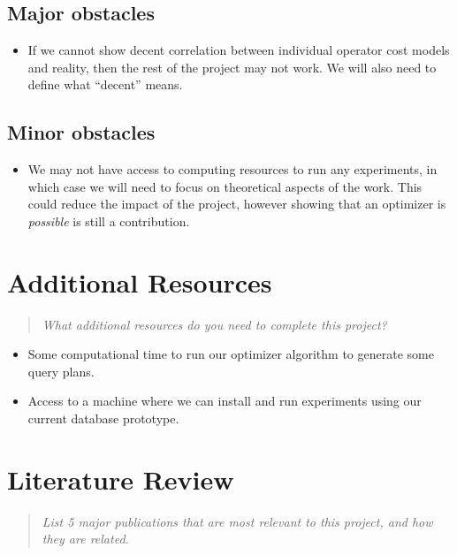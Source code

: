 \documentclass[10pt, sigconf]{acmart}
\begin{document}
\subsection{Major obstacles} 

\begin{itemize}
  \item If we cannot show decent correlation between individual operator cost models and reality, then the rest of the project may not work.  We will also need to define what ``decent'' means.
\end{itemize}

\subsection{Minor obstacles}

\begin{itemize}
  \item We may not have access to computing resources to run any experiments, in which case we will need to focus on theoretical aspects of the work.  This could reduce the impact of the project, however showing that an optimizer is \emph{possible} is still a contribution.
\end{itemize}


\section{Additional Resources}
\begin{quote}
\emph{What additional resources do you need to complete this project?}
\end{quote}

\begin{itemize}
  \item Some computational time to run our optimizer algorithm to generate some query plans.
  \item Access to a machine where we can install and run experiments using our current database prototype.
 \end{itemize}
 
\section{Literature Review}
\begin{quote}
\emph{List 5 major publications that are most relevant to this project, and how they are related.}
\end{quote}
\end{document}
